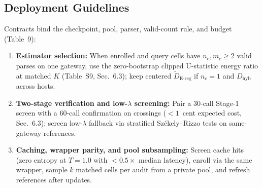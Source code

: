 \documentclass[10pt,journal,compsoc]{IEEEtran}
\newcommand{\Dereg}{\tilde D_{\mathrm{E\mbox{-}reg}}}
\newcommand{\Dhyb}{D_{\mathrm{hyb}}}
\begin{document}
\subsection{Deployment Guidelines}
Contracts bind the checkpoint, pool, parser, valid-count rule, and budget (Table~9):
\begin{enumerate}
    \item \textbf{Estimator selection:} When enrolled and query cells have $n_c, m_c \ge 2$ valid parses on one gateway, use the zero-bootstrap clipped U-statistic energy ratio at matched $K$ (Table~S9, Sec.~6.3); keep centered $\Dereg{}$ if $n_c = 1$ and $\Dhyb{}$ across hosts.
    \item \textbf{Two-stage verification and low-$\lambda$ screening:} Pair a 30-call Stage-1 screen with a 60-call confirmation on crossings ($<1$~cent expected cost, Sec.~6.3); screen low-$\lambda$ fallback via stratified Sz\'ekely--Rizzo tests on same-gateway references.
    \item \textbf{Caching, wrapper parity, and pool subsampling:} Screen cache hits (zero entropy at $T=1.0$ with $<0.5\times$ median latency), enroll via the same wrapper, sample $k$ matched cells per audit from a private pool, and refresh references after updates.
\end{enumerate}
\end{document}
